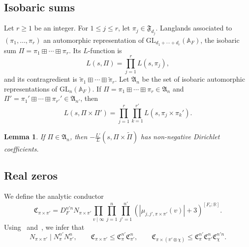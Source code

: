 \documentclass[11pt]{amsart}
\newtheorem{lemma}[theorem]{Lemma}
\theoremstyle{remark}
\numberwithin{equation}{section}
\begin{document}
\subsection{Isobaric sums}
\label{subsec:isobaric}

Let $r\geq 1$ be an integer.  For $1\leq j\leq r$, let $\pi_{j}\in\mathfrak{F}_{d_j}$.  Langlands associated to $(\pi_1,\ldots,\pi_r)$ an automorphic representation of $\mathrm{GL}_{d_1+\cdots+d_r}(\mathbb{A}_F)$, the isobaric sum $\Pi=\pi_1\boxplus\cdots\boxplus\pi_r$.  Its $L$-function is
\[
L(s,\Pi)=\prod_{j=1}^r L(s,\pi_j),
\]
and its contragredient is $\widetilde{\pi}_1\boxplus\cdots\boxplus\widetilde{\pi}_r$.  Let $\mathfrak{A}_{n}$ be the set of isobaric automorphic representations of $\mathrm{GL}_n(\mathbb{A}_F)$.  If $\Pi=\pi_1\boxplus\cdots\boxplus\pi_r\in\mathfrak{A}_n$ and $\Pi'=\pi_1'\boxplus\cdots\boxplus\pi_{r'}'\in\mathfrak{A}_{n'}$, then
\begin{equation}
\label{eqn:isobaric_RS}
L(s,\Pi\times\Pi')=\prod_{j=1}^r \prod_{k=1}^{r'} L(s,\pi_j\times\pi_k').
\end{equation}
\begin{lemma}\cite{HoffsteinRamakrishnan}
\label{lem:HR}
If $\Pi\in\mathfrak{A}_{n}$, then $-\frac{L'}{L}(s,\Pi\times\widetilde{\Pi})$ has non-negative Dirichlet coefficients.
\end{lemma}

\subsection{Real zeros}
	
We define the analytic conductor
	\[
	\mathfrak{C}_{\pi\times\pi'}=D_F^{n'n}N_{\pi\times{\pi}'}\prod_{v\mid\infty}\prod_{j=1}^n \prod_{j'=1}^{n'} (|\mu_{j,j',\pi\times{\pi}'}(v)|+3)^{[F_v:\mathbb{R}]}.
	\]
	Using~\cite[Theorem 2]{BushnellHenniart} and~\cite[Lemma~A.1]{Wattanawanichkul}, we infer that
	\begin{equation}
		\label{eqn:BH}
		N_{\pi\times\pi'}\mid N_{\pi}^{n'}N_{\pi'}^{n},\qquad \mathfrak{C}_{\pi\times\pi'}\leq \mathfrak{C}_{\pi}^{n'}\mathfrak{C}_{\pi'}^{n},\qquad \mathfrak{C}_{\pi\times(\pi'\otimes\chi)}\leq \mathfrak{C}_{\pi}^{n'}\mathfrak{C}_{\pi'}^{n}\mathfrak{C}_{\chi}^{n'n}.
	\end{equation}
\end{document}
